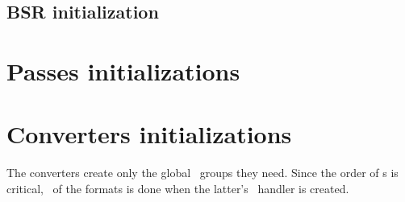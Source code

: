 \subsection{BSR initialization}


\section{Passes initializations}


\section{Converters initializations}

The converters create only the global \oahRepr\ groups they need. Since the order of \initialization s is critical, \initialization\ of the formats is done when the latter's \insider\ handler is created.

